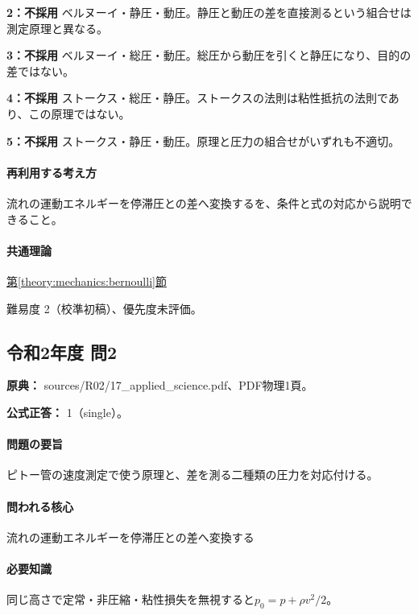 \noindent\textbf{2：不採用} ベルヌーイ・静圧・動圧。静圧と動圧の差を直接測るという組合せは測定原理と異なる。\par

\noindent\textbf{3：不採用} ベルヌーイ・総圧・動圧。総圧から動圧を引くと静圧になり、目的の差ではない。\par

\noindent\textbf{4：不採用} ストークス・総圧・静圧。ストークスの法則は粘性抵抗の法則であり、この原理ではない。\par

\noindent\textbf{5：不採用} ストークス・静圧・動圧。原理と圧力の組合せがいずれも不適切。\par

\paragraph{再利用する考え方} 流れの運動エネルギーを停滞圧との差へ変換するを、条件と式の対応から説明できること。

\paragraph{共通理論} \hyperref[theory:mechanics:bernoulli]{第\ref*{theory:mechanics:bernoulli}節}

\par 難易度 2（校準初稿）、優先度未評価。

\subsection{令和2年度 問2}
\label{q:r02-reg-applied-02}

\noindent\textbf{原典：} sources/R02/17\_applied\_science.pdf、PDF物理1頁。

\textbf{公式正答：} 1（single）。

\paragraph{問題の要旨} ピトー管の速度測定で使う原理と、差を測る二種類の圧力を対応付ける。

\paragraph{問われる核心} 流れの運動エネルギーを停滞圧との差へ変換する

\paragraph{必要知識} 同じ高さで定常・非圧縮・粘性損失を無視すると\(p_0=p+\rho v^2/2\)。

